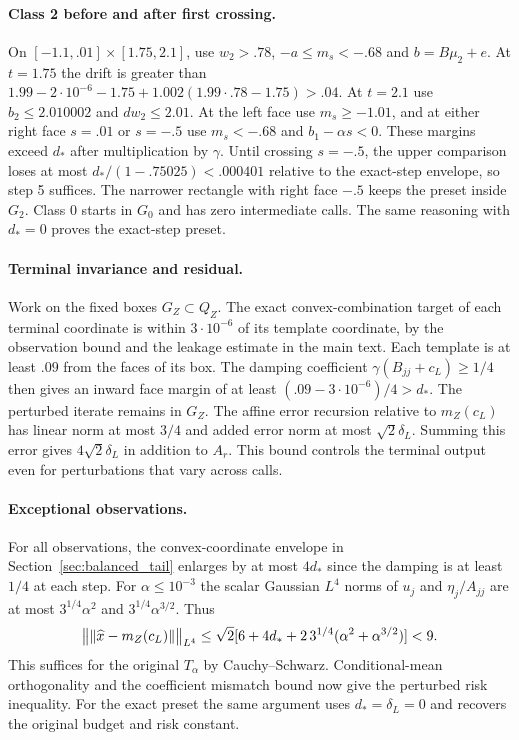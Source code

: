 \paragraph{Class 2 before and after first crossing.}
On $[-1.1,.01]\times[1.75,2.1]$, use $w_2>.78$, $-a\le m_s<-.68$ and $b=B\mu_2+e$. At $t=1.75$ the drift is greater than $1.99-2\cdot10^{-6}-1.75+1.002(1.99\cdot.78-1.75)>.04$. At $t=2.1$ use $b_2\le2.010002$ and $d w_2\le2.01$. At the left face use $m_s\ge-1.01$, and at either right face $s=.01$ or $s=-.5$ use $m_s<-.68$ and $b_1-\alpha s<0$. These margins exceed $d_*$ after multiplication by $\gamma$. Until crossing $s=-.5$, the upper comparison loses at most $d_* /(1-.75025)<.000401$ relative to the exact-step envelope, so step 5 suffices. The narrower rectangle with right face $-.5$ keeps the preset inside $G_2$. Class 0 starts in $G_0$ and has zero intermediate calls. The same reasoning with $d_*=0$ proves the exact-step preset.

\paragraph{Terminal invariance and residual.}
Work on the fixed boxes $G_Z\subset Q_Z$. The exact convex-combination target of each terminal coordinate is within $3\cdot10^{-6}$ of its template coordinate, by the observation bound and the leakage estimate in the main text. Each template is at least $.09$ from the faces of its box. The damping coefficient $\gamma(B_{jj}+c_L)\ge1/4$ then gives an inward face margin of at least $(.09-3\cdot10^{-6})/4>d_*$. The perturbed iterate remains in $G_Z$. The affine error recursion relative to $m_Z(c_L)$ has linear norm at most $3/4$ and added error norm at most $\sqrt2\delta_L$. Summing this error gives $4\sqrt2\delta_L$ in addition to $A_r$. This bound controls the terminal output even for perturbations that vary across calls.

\paragraph{Exceptional observations.}
For all observations, the convex-coordinate envelope in Section~\ref{sec:balanced_tail} enlarges by at most $4d_*$ since the damping is at least $1/4$ at each step. For $\alpha\le10^{-3}$ the scalar Gaussian $L^4$ norms of $u_j$ and $\eta_j/A_{jj}$ are at most $3^{1/4}\alpha^2$ and $3^{1/4}\alpha^{3/2}$. Thus
\[
\big\|\lVert\widehat x-m_Z(c_L)\rVert\big\|_{L^4}
\le\sqrt2[6+4d_*+2\,3^{1/4}(\alpha^2+\alpha^{3/2})]<9.
\]
This suffices for the original $T_\alpha$ by Cauchy--Schwarz. Conditional-mean orthogonality and the coefficient mismatch bound now give the perturbed risk inequality. For the exact preset the same argument uses $d_*=\delta_L=0$ and recovers the original budget and risk constant.

